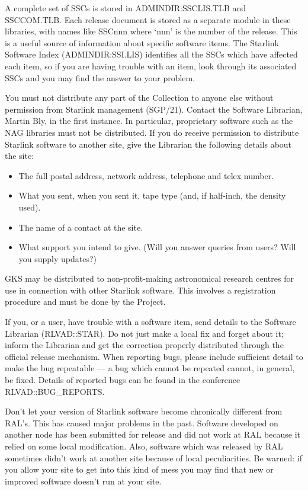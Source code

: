 A complete set of SSCs is stored in ADMINDIR:SSCLIS.TLB and SSCCOM.TLB.
Each release document is stored as a separate module in these libraries, with
names like SSCnnn where `nnn' is the number of the release.
This is a useful source of information about specific software items.
The Starlink Software Index (ADMINDIR:SSI.LIS) identifies all the SSCs which
have affected each item, so if you are having trouble with an item, look
through its associated SSCs and you may find the answer to your problem.

You must not distribute any part of the Collection to anyone else without
permission from Starlink management (SGP/21).
Contact the Software Librarian, Martin Bly, in the first instance.
In particular, proprietary software such as the NAG libraries must not be
distributed.
If you do receive permission to distribute Starlink software to another site,
give the Librarian the following details about the site:
\begin{itemize}
\item The full postal address, network address, telephone and telex number.
\item What you sent, when you sent it, tape type (and, if half-inch, the
density used).
\item The name of a contact at the site.
\item What support you intend to give. (Will you answer queries from users?
Will you supply updates?)
\end{itemize}
GKS may be distributed to non-profit-making astronomical research centres
for use in connection with other Starlink software.
This involves a registration procedure and must be done by the Project.
 
If you, or a user, have trouble with a software item, send details to the
Software Librarian (RLVAD::STAR).
Do not just make a local fix and forget about it; inform the Librarian and
get the correction properly distributed through the official release mechanism.
When reporting bugs, please include sufficient detail to make the bug
repeatable --- a bug which cannot be repeated cannot, in general, be fixed.
Details of reported bugs can be found in the conference RLVAD::BUG\_REPORTS.

Don't let your version of Starlink software become chronically different from
RAL's.
This has caused major problems in the past.
Software developed on another node has been submitted for release and did not
work at RAL because it relied on some local modification.
Also, software which was released by RAL sometimes didn't work at another
site because of local peculiarities.
Be warned: if you allow your site to get into this kind of mess you may
find that new or improved software doesn't run at your site.

